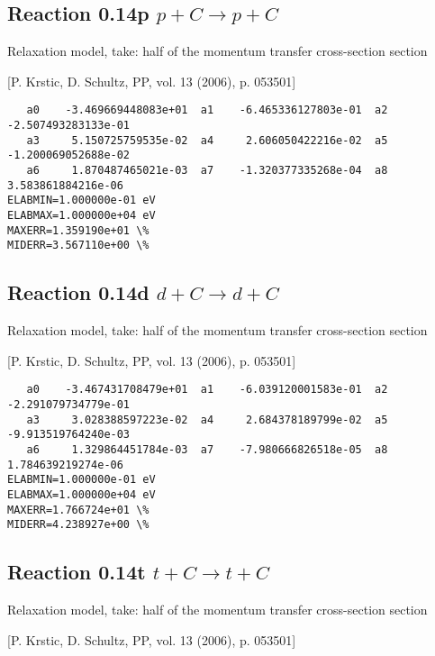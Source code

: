 \documentclass[12pt,dvipdfmx]{article}
\begin{document}
\newpage

\subsection{
Reaction 0.14p   $ p + C \rightarrow p + C $
}

Relaxation model, take: half of the momentum transfer cross-section
section

[P. Krstic, D. Schultz, PP, vol. 13 (2006), p. 053501]

\begin{small}\begin{verbatim}
   a0    -3.469669448083e+01  a1    -6.465336127803e-01  a2    -2.507493283133e-01
   a3     5.150725759535e-02  a4     2.606050422216e-02  a5    -1.200069052688e-02
   a6     1.870487465021e-03  a7    -1.320377335268e-04  a8     3.583861884216e-06
ELABMIN=1.000000e-01 eV
ELABMAX=1.000000e+04 eV
MAXERR=1.359190e+01 \%
MIDERR=3.567110e+00 \%
\end{verbatim}\end{small}

\subsection{
Reaction 0.14d   $ d + C \rightarrow d + C $
}

Relaxation model, take: half of the momentum transfer cross-section
section

[P. Krstic, D. Schultz, PP, vol. 13 (2006), p. 053501]

\begin{small}\begin{verbatim}
   a0    -3.467431708479e+01  a1    -6.039120001583e-01  a2    -2.291079734779e-01
   a3     3.028388597223e-02  a4     2.684378189799e-02  a5    -9.913519764240e-03
   a6     1.329864451784e-03  a7    -7.980666826518e-05  a8     1.784639219274e-06
ELABMIN=1.000000e-01 eV
ELABMAX=1.000000e+04 eV
MAXERR=1.766724e+01 \%
MIDERR=4.238927e+00 \%
\end{verbatim}\end{small}

\subsection{
Reaction 0.14t   $ t + C \rightarrow t + C $
}

Relaxation model, take: half of the momentum transfer cross-section
section

[P. Krstic, D. Schultz, PP, vol. 13 (2006), p. 053501]
\end{document}
